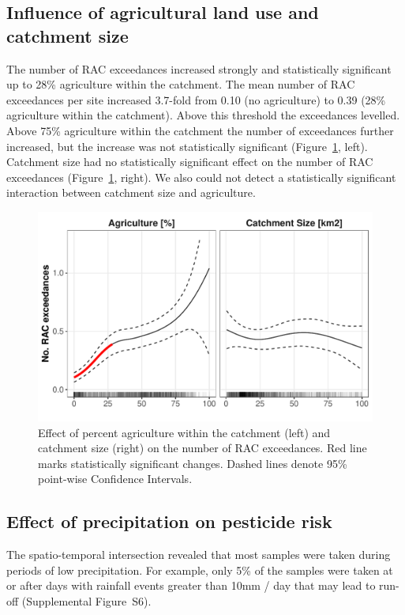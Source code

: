 \clearpage
\subsection{Influence of agricultural land use and catchment size}
The number of RAC exceedances increased strongly and statistically significant up to 28\% agriculture within the catchment.
The mean number of RAC exceedances per site increased 3.7-fold from 0.10 (no agriculture) to 0.39 (28\% agriculture within the catchment). 
Above this threshold the exceedances levelled.
Above 75\% agriculture within the catchment the number of exceedances further increased, but the increase was not statistically significant (Figure~\ref{fig:ss:fig4}, left). 
Catchment size had no statistically significant effect on the number of RAC exceedances (Figure~\ref{fig:ss:fig4}, right).
We also could not detect a statistically significant interaction between catchment size and agriculture. 

\begin{figure}[ht]
  \includegraphics[width=\textwidth]{chapters/smallstreams/figure4.pdf}
  \caption[Effect of percent agriculture within the catchment and catchment size on the number of RAC exceedances.]{Effect of percent agriculture within the catchment (left) and catchment size (right) on the number of RAC exceedances. Red line marks statistically significant changes. Dashed lines denote 95\% point-wise Confidence Intervals.
  }
  \label{fig:ss:fig4}
\end{figure}


\clearpage
\subsection{Effect of precipitation on pesticide risk}
The spatio-temporal intersection revealed that most samples were taken during periods of low precipitation.
For example, only 5\% of the samples were taken at or after days with rainfall events greater than 10mm / day that may lead to run-off (Supplemental Figure~S6). 

